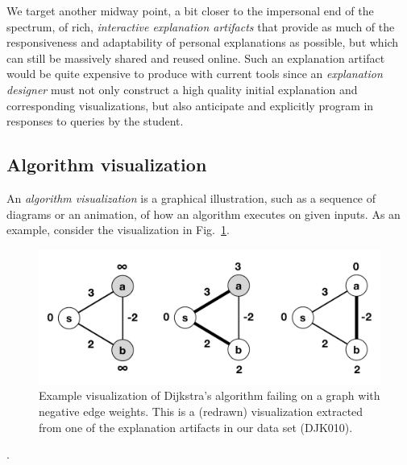 \documentclass[conference]{IEEEtran}
\begin{document}
We target another midway point, a bit closer to the impersonal end of the
spectrum, of rich, \emph{interactive explanation artifacts} that provide as
much of the responsiveness and adaptability of personal explanations as
possible, but which can still be massively shared and reused online. Such an
explanation artifact would be quite expensive to produce with current tools
since an \emph{explanation designer} must not only construct a high quality
initial explanation and corresponding visualizations, but also anticipate and
explicitly program in responses to queries by the student.




\subsection{Algorithm visualization}
\label{sec:vis}


An \emph{algorithm visualization} is a graphical illustration, such as a
sequence of diagrams or an animation, of how an algorithm executes on given
inputs. As an example, consider the visualization in
Fig.~\ref{fig:negative-dijkstra}.

\begin{figure}
\centering
\includegraphics[width=0.9\columnwidth]{VisDJK010-Clean}
\caption{Example visualization of Dijkstra's algorithm failing on a graph with
negative edge weights. This is a (redrawn) visualization extracted from one of
the explanation artifacts in our data set (DJK010).}
\label{fig:negative-dijkstra}
\end{figure}


%
\cite{HDS02}.
\end{document}
